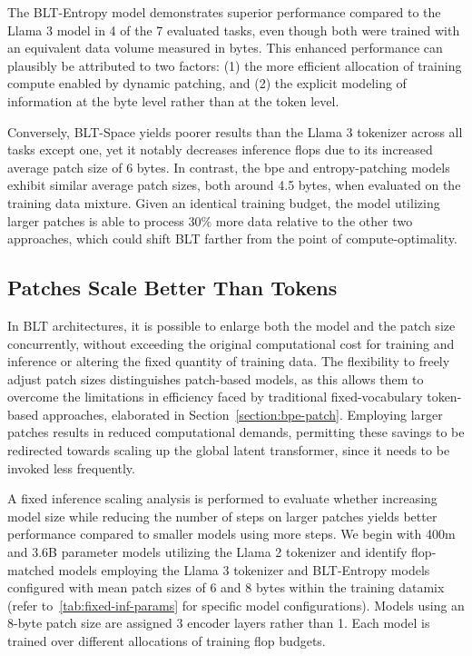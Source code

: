 The {\textsc BLT}-Entropy model demonstrates superior performance compared to the Llama 3 model in 4 of the 7 evaluated tasks, even though both were trained with an equivalent data volume measured in bytes. This enhanced performance can plausibly be attributed to two factors: (1) the more efficient allocation of training compute enabled by dynamic patching, and (2) the explicit modeling of information at the byte level rather than at the token level.

Conversely, {\textsc BLT}-Space yields poorer results than the Llama 3 tokenizer across all tasks except one, yet it notably decreases inference flops due to its increased average patch size of 6 bytes. In contrast, the bpe and entropy-patching models exhibit similar average patch sizes, both around 4.5 bytes, when evaluated on the training data mixture. Given an identical training budget, the model utilizing larger patches is able to process 30\% more data relative to the other two approaches, which could shift {\textsc BLT} farther from the point of compute-optimality.

\subsection{Patches Scale Better Than Tokens} In {\textsc BLT} architectures, it is possible to enlarge both the model and the patch size concurrently, without exceeding the original computational cost for training and inference or altering the fixed quantity of training data. The flexibility to freely adjust patch sizes distinguishes patch-based models, as this allows them to overcome the limitations in efficiency faced by traditional fixed-vocabulary token-based approaches, elaborated in Section~\ref{section:bpe-patch}. Employing larger patches results in reduced computational demands, permitting these savings to be redirected towards scaling up the global latent transformer, since it needs to be invoked less frequently.

A fixed inference scaling analysis is performed to evaluate whether increasing model size while reducing the number of steps on larger patches yields better performance compared to smaller models using more steps. We begin with 400m and 3.6B parameter models utilizing the Llama 2 tokenizer and identify flop-matched models employing the Llama 3 tokenizer and {\textsc BLT}-Entropy models configured with mean patch sizes of 6 and 8 bytes within the training datamix (refer to~\autoref{tab:fixed-inf-params} for specific model configurations). Models using an 8-byte patch size are assigned 3 encoder layers rather than 1. Each model is trained over different allocations of training flop budgets.

